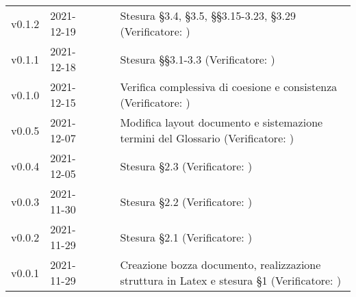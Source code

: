 \begin{longtable}{ m{}<{\centering}  m{}<{\centering}  m{}<{\centering}  m{}<{\centering}  m{}<{\centering} }
	v0.1.2 & 2021-12-19 & \GC{} & \AN{} & Stesura §3.4, §3.5, §§3.15-3.23, §3.29 (Verificatore: \textit{\PV})\\	

	v0.1.1 & 2021-12-18 & \FP{} & \AN{} & Stesura §§3.1-3.3 (Verificatore: \textit{\PV})\\	

	v0.1.0 & 2021-12-15 & \FP{} & \AN{} & Verifica complessiva di coesione e consistenza (Verificatore: \textit{\PV})\\
	
	v0.0.5& 2021-12-07 & \GC{} & \AN{} & Modifica layout documento e sistemazione termini del Glossario (Verificatore: \textit{\PV{}})\\

	v0.0.4& 2021-12-05 & \LW{} & \AN{} & Stesura §2.3 (Verificatore: \textit{\PV{}})\\

	v0.0.3& 2021-11-30 & \GC & \AN{} & Stesura §2.2 (Verificatore: \textit{\PV{}})\\

	v0.0.2& 2021-11-29 & \FP{} & \AN{} & Stesura §2.1 (Verificatore: \textit{\PV{}})\\

	v0.0.1& 2021-11-29 & \LW{} & \AN{} & Creazione bozza documento, realizzazione struttura in Latex e stesura §1 (Verificatore: \textit{\PV{}})\\

\end{longtable}

\pagebreak